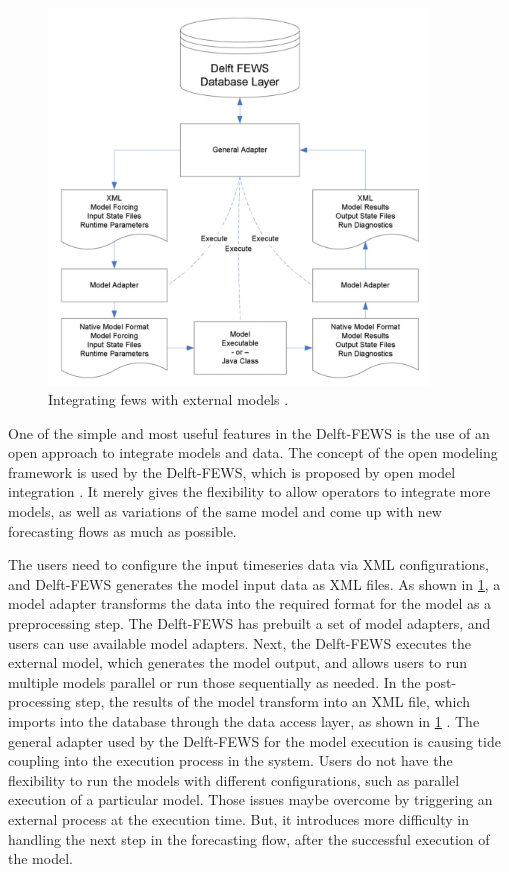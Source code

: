\begin{figure}[htp]
    \centering
    \includegraphics[width=0.9\textwidth]{lit/fews/Linking-Delft-FEWS-with-external-models-The-fi-gure-shows-the-fl-ow-of-data-through-XML_W640.png}
    \caption[\acrshort{fews} integration with external models]{Integrating \acrshort{fews} with external models \cite{Werner2013TheSystem}.}
    \label{fi:fews_general_adapter}
\end{figure}

One of the simple and most useful features in the Delft-FEWS is the use of an open approach to integrate models and data. The concept of the open modeling framework is used by the Delft-FEWS, which is proposed by open model integration \cite{Kokkonen2003InterfacingXML}. It merely gives the flexibility to allow operators to integrate more models, as well as variations of the same model and come up with new forecasting flows as much as possible.

The users need to configure the input timeseries data via XML configurations, and Delft-FEWS generates the model input data as XML files. As shown in \cref{fi:fews_general_adapter}, a model adapter transforms the data into the required format for the model as a preprocessing step. The Delft-FEWS has prebuilt a set of model adapters, and users can use available model adapters. Next, the Delft-FEWS executes the external model, which generates the model output, and allows users to run multiple models parallel or run those sequentially as needed. In the post-processing step, the results of the model transform into an XML file, which imports into the database through the data access layer, as shown in \cref{fi:fews_general_adapter} \cite{Werner2013TheSystem}. The general adapter used by the Delft-FEWS for the model execution is causing tide coupling into the execution process in the system. Users do not have the flexibility to run the models with different configurations, such as parallel execution of a particular model. Those issues maybe overcome by triggering an external process at the execution time. But, it introduces more difficulty in handling the next step in the forecasting flow, after the successful execution of the model. 

